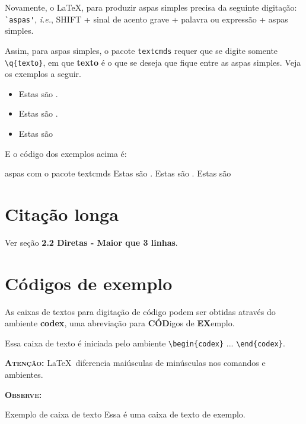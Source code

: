 \documentclass[a4paper,12pt,oneside]{memoir}
\begin{document}
Novamente, o \LaTeX, para produzir aspas simples precisa da seguinte digitação: \verb|`aspas'|, \textit{i.e.}, SHIFT + sinal de acento grave + palavra ou expressão + aspas simples.

Assim, para aspas simples, o pacote \verb|textcmds| requer que se digite somente \verb|\q{texto}|, em que \textbf{texto} é o que se deseja que fique entre as aspas simples. Veja os exemplos a seguir.

\begin{itemize}
	\itemsep0em
	\item Estas são .
	\item Estas são .
	\item Estas são 
\end{itemize}

E o código dos exemplos acima é:

\begin{codex}{aspas com o pacote textcmds}
Estas são .
Estas são .
Estas são 
\end{codex}

\section{Citação longa}

Ver seção \textbf{2.2 Diretas - Maior que 3 linhas}.

\section{Códigos de exemplo}

As caixas de textos para digitação de código podem ser obtidas através do ambiente \textbf{codex}, uma abreviação para \textbf{CÓD}igos de \textbf{EX}emplo.

Essa caixa de texto é iniciada pelo ambiente \verb|\begin{codex}| ... \verb|\end{codex}|. 

\textsc{\textbf{Atenção:}} \LaTeX\ diferencia maiúsculas de minúsculas nos comandos e ambientes.

\noindent\textbf{\textsc{Observe:}}

\begin{codex}{Exemplo de caixa de texto}
Essa é uma caixa de texto de exemplo.
\end{codex}
\end{document}
